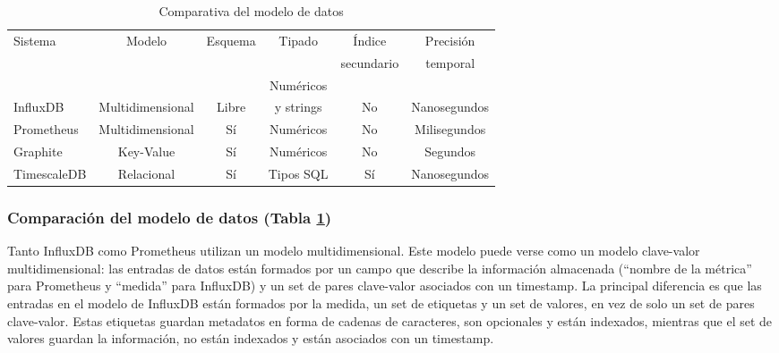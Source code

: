 \begin{table}[H]
    \begin{center}
        \begin{adjustbox}{max width=\textwidth}
            \begin{tabular}{l c c c c c}
                \toprule
                \multirow{2}{*}{Sistema} & \multirow{2}{*}{Modelo} & \multirow{2}{*}{Esquema} & \multirow{2}{*}{Tipado} & Índice & Precisión\\
                &&&& secundario & temporal \\
                \otoprule
                &&& Numéricos && \\
                \multirow{-2}{*}{InfluxDB}    & \multirow{-2}{*}{Multidimensional} & \multirow{-2}{*}{Libre} & y strings & \multirow{-2}{*}{No} & \multirow{-2}{*}{Nanosegundos} \\
                \rowcolor{gray!35}
                Prometheus  & Multidimensional & Sí & Numéricos & No & Milisegundos \\
                Graphite    & Key-Value & Sí & Numéricos & No & Segundos \\
                \rowcolor{gray!35}
                TimescaleDB & Relacional & Sí & Tipos SQL & Sí & Nanosegundos \\
                \bottomrule
            \end{tabular}
        \end{adjustbox}
        \caption{Comparativa del modelo de datos}
        \label{tabla:dmsgbd}
    \end{center}
\end{table}

\subsubsection{Comparación del modelo de datos (Tabla \ref{tabla:dmsgbd})} Tanto InfluxDB como Prometheus utilizan un modelo 
multidimensional. Este modelo puede verse como un modelo clave-valor multidimensional: las entradas de datos están formados 
por un campo que describe la información almacenada (``nombre de la métrica'' para Prometheus y ``medida'' para InfluxDB) 
y un set de pares clave-valor asociados con un timestamp. La principal diferencia es que las entradas en el modelo de InfluxDB 
están formados por la medida, un set de etiquetas y un set de valores, en vez de solo un set de pares clave-valor. 
Estas etiquetas guardan metadatos en forma de cadenas de caracteres, son opcionales y están indexados, mientras que el set de 
valores guardan la información, no están indexados y están asociados con un timestamp.


